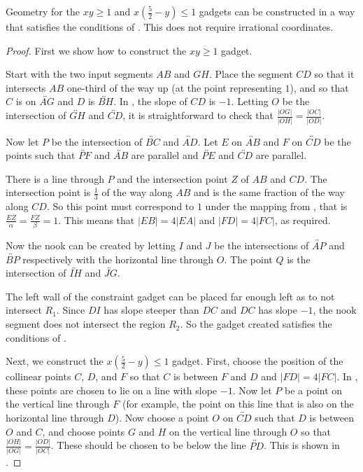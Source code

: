 \begin{lemma}\label{lem:InversionConstruction}
Geometry for the $xy\ge 1$ and $x\left(\frac{5}2-y\right)\le 1$ gadgets can be constructed in a way that satisfies the conditions of . This does not require irrational coordinates.
\end{lemma}

\begin{proof}
First we show how to construct the $xy\ge 1$ gadget.

Start with the two input segments $AB$ and $GH$. Place the segment $CD$ so that it intersects $AB$ one-third of the way up (at the point representing $1$), and so that $C$ is on $\overleftrightarrow{AG}$ and $D$ is $\overleftrightarrow{BH}$. In , the slope of $CD$ is $-1$. Letting $O$ be the intersection of $\overleftrightarrow{GH}$ and $\overleftrightarrow{CD}$, it is straightforward to check that $\frac{|OG|}{|OH|}=\frac{|OC|}{|OD|}$. 

Now let $P$ be the intersection of $\overleftrightarrow{BC}$ and $\overleftrightarrow{AD}$. Let $E$ on $\overleftrightarrow{AB}$ and $F$ on $\overleftrightarrow{CD}$ be the points such that $\overleftrightarrow{PF}$ and $\overleftrightarrow{AB}$ are parallel and $\overleftrightarrow{PE}$ and $\overleftrightarrow{CD}$ are parallel. 

There is a line through $P$ and the intersection point $Z$ of $AB$ and $CD$. The intersection point is $\frac13$ of the way along $AB$ and is the same fraction of the way along $CD$. So this point must correspond to $1$ under the mapping from , that is $\frac{EZ}{\alpha}=\frac{FZ}{\beta}=1$. This means that $|EB|=4|EA|$ and $|FD|=4|FC|$, as required.

Now the nook can be created by letting $I$ and $J$ be the intersections of $\overleftrightarrow{AP}$ and $\overleftrightarrow{BP}$ respectively with the horizontal line through $O$. The point $Q$ is the intersection of $\overleftrightarrow{IH}$ and $\overleftrightarrow{JG}$. 

The left wall of the constraint gadget can be placed far enough left as to not intersect $R_1$. Since $DI$ has slope steeper than $DC$ and $DC$ has slope $-1$, the nook segment does not intersect the region $R_2$. So the gadget created satisfies the conditions of .

Next, we construct the $x\left(\frac{5}2-y\right)\le 1$ gadget. First, choose the position of the collinear points $C$, $D$, and $F$ so that $C$ is between $F$ and $D$ and $|FD|=4|FC|$. In , these points are chosen to lie on a line with slope $-1$. Now let $P$ be a point on the vertical line through $F$ (for example, the point on this line that is also on the horizontal line through $D$). Now choose a point $O$ on $\overleftrightarrow{CD}$ such that $D$ is between $O$ and $C$, and choose points $G$ and $H$ on the vertical line through $O$ so that $\frac{|OH|}{|OG|}=\frac{|OD|}{|OC|}$. These should be chosen to be below the line $\overleftrightarrow{PD}$. This is shown in .


\end{proof}
